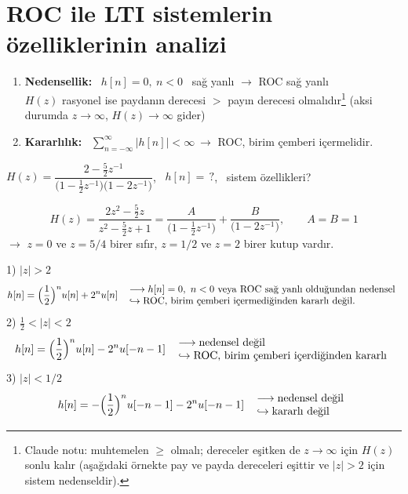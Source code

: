 \documentclass[11pt,a4paper]{article}
\begin{document}
\section{ROC ile LTI sistemlerin özelliklerinin analizi}
\begin{enumerate}[label=\arabic*)]
  \item \textbf{Nedensellik:} \ $h[n]=0,\ n<0$ \ sağ yanlı $\longrightarrow$ ROC sağ yanlı\\
    $H(z)$ rasyonel ise paydanın derecesi $>$ payın derecesi olmalıdır\footnote{Claude notu: muhtemelen $\geq$ olmalı; dereceler eşitken de $z\to\infty$ için $H(z)$ sonlu kalır (aşağıdaki örnekte pay ve payda dereceleri eşittir ve $|z|>2$ için sistem nedenseldir).} (aksi durumda $z\to\infty$, $H(z)\to\infty$ gider)
  \item \textbf{Kararlılık:} \ $\displaystyle\sum_{n=-\infty}^{\infty}|h[n]|<\infty\ \longrightarrow$ ROC, birim çemberi içermelidir.
\end{enumerate}

\begin{ornek}[]
  $H(z)=\dfrac{2-\frac52z^{-1}}{\bigl(1-\frac12z^{-1}\bigr)\bigl(1-2z^{-1}\bigr)}$, \ $h[n]=\,?$, \ sistem özellikleri?
\end{ornek}
\[
  H(z)=\frac{2z^2-\frac52z}{z^2-\frac52z+1}=\frac{A}{\bigl(1-\frac12z^{-1}\bigr)}+\frac{B}{\bigl(1-2z^{-1}\bigr)},\qquad A=B=1
\]
$\rightarrow$ $z=0$ ve $z=5/4$ birer sıfır, $z=1/2$ ve $z=2$ birer kutup vardır.
\begin{center}
\end{center}
1) $|z|>2$
\[
  h[n]=\Bigl(\frac12\Bigr)^nu[n]+2^nu[n]\ \
  \begin{array}{l}
    \longrightarrow h[n]=0,\ n<0 \text{ veya ROC sağ yanlı olduğundan nedensel}\\
    \hookrightarrow \text{ROC, birim çemberi içermediğinden kararlı değil.}
  \end{array}
\]
2) $\frac12<|z|<2$
\[
  h[n]=\Bigl(\frac12\Bigr)^nu[n]-2^nu[-n-1]\ \
  \begin{array}{l}
    \longrightarrow \text{nedensel değil}\\
    \hookrightarrow \text{ROC, birim çemberi içerdiğinden kararlı}
  \end{array}
\]
3) $|z|<1/2$
\[
  h[n]=-\Bigl(\frac12\Bigr)^nu[-n-1]-2^nu[-n-1]\ \
  \begin{array}{l}
    \longrightarrow \text{nedensel değil}\\
    \hookrightarrow \text{kararlı değil}
  \end{array}
\]
\end{document}
